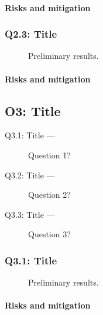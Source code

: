 \documentclass{nsf}
\begin{document}
\paragraph{Risks and mitigation}
\lipsum[4]

\subsubsection{Q2.3: Title}
\label{sec:q23}

\begin{wrapfigure}[14]{r}{.5\textwidth}
  \centering
  \caption{Preliminary results.}
  \label{fig:q23fig}
\end{wrapfigure}
\lipsum[1-3]
\paragraph{Risks and mitigation}
\lipsum[4]

\subsection{O3: Title}
\label{sec:o3}

\lipsum[1]

\begin{questions}
  \begin{description}
  \item[Q3.1: Title —] Question 1?
  \item[Q3.2: Title —] Question 2?
  \item[Q3.3: Title —] Question 3?
  \end{description}
\end{questions}

\subsubsection{Q3.1: Title}
\label{sec:q31}

\begin{wrapfigure}[14]{r}{.5\textwidth}
  \centering
  \caption{Preliminary results.}
  \label{fig:q31fig}
\end{wrapfigure}
\lipsum[1-3]
\paragraph{Risks and mitigation}
\lipsum[4]
\end{document}
